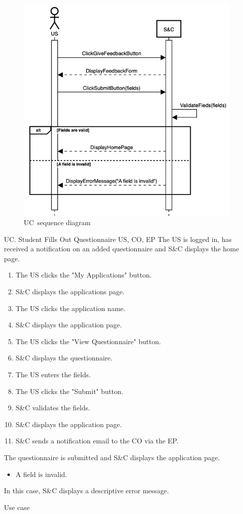 \begin{figure}[h]
    \centering
    \includegraphics[width=11cm]{images/sequence-diagrams/student-fills-out-feedback-form.png}
    \caption{UC\theuc\ sequence diagram}
\end{figure}


\clearpage
\begin{usecase}
    {UC\theuc. Student Fills Out Questionnaire}
    {US, CO, EP}
    {The US is logged in, has received a notification on an added questionnaire and S\&C displays the home page.}
    {\begin{enumerate}[leftmargin=*]
        \item The US clicks the "My Applications" button.
        \item S\&C displays the applications page.
        \item The US clicks the application name.
        \item S\&C displays the application page.
        \item The US clicks the "View Questionnaire" button.
        \item S\&C displays the questionnaire.
        \item The US enters the fields.
        \item The US clicks the "Submit" button.
        \item S\&C validates the fields.
        \item S\&C displays the application page.
        \item S\&C sends a notification email to the CO via the EP.
    \end{enumerate}}
    {The questionnaire is submitted and S\&C displays the application page.}
    {\begin{itemize}[leftmargin=*, label=\tiny\textbullet]
        \item A field is invalid.
    \end{itemize}
    In this case, S\&C displays a descriptive error message.}
    {Use case \theuc}
\end{usecase}

